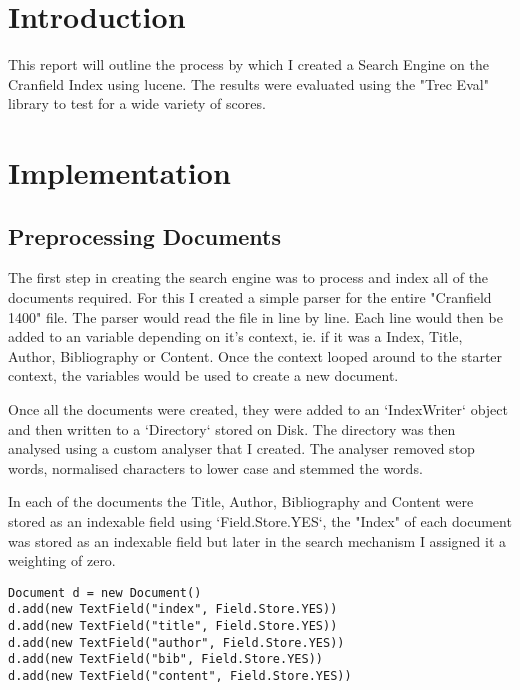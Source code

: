 \section{Introduction}
  This report will outline the process by which I created a Search Engine on the Cranfield Index using lucene.\newline
  The results were evaluated using the "Trec Eval" library to test for a wide variety of scores.

\section{Implementation}
\subsection{Preprocessing Documents}
  The first step in creating the search engine was to process and index all of the documents required. For this I created a simple parser for the entire "Cranfield 1400" file. The parser would read the file in line by line. Each line would then be added to an variable  depending on it's context, ie. if it was a Index, Title, Author, Bibliography or Content. Once the context looped around to the starter context, the variables would be used to create a new document. \par
  Once all the documents were created, they were added to an `IndexWriter` object and then written to a `Directory` stored on Disk. The directory was then analysed using a custom analyser that I created. The analyser removed stop words, normalised characters to lower case and stemmed the words.\par
  In each of the documents the Title, Author, Bibliography and Content were stored as an indexable field using `Field.Store.YES`, the "Index" of each document was stored as an indexable field but later in the search mechanism I assigned it a weighting of zero.
\begin{lstlisting}
Document d = new Document()
d.add(new TextField("index", Field.Store.YES))
d.add(new TextField("title", Field.Store.YES))
d.add(new TextField("author", Field.Store.YES))
d.add(new TextField("bib", Field.Store.YES))
d.add(new TextField("content", Field.Store.YES))
\end{lstlisting}


